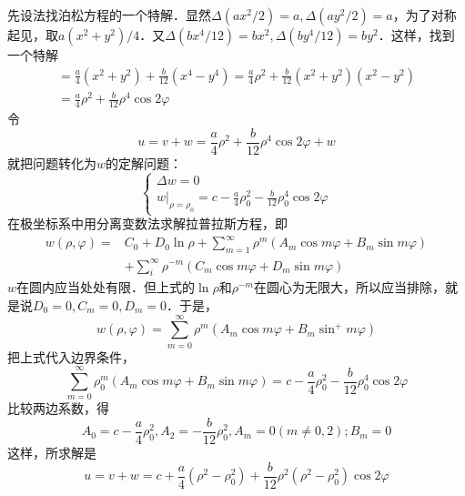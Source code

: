 \begin{example}{}
先设法找泊松方程的一个特解．显然$\Delta (ax^2/2)=a, \Delta (ay^2/2)=a$，为了对称起见，取$a(x^2+y^2)/4$．又$\Delta (bx^4/12)=bx^2,\Delta (by^4/12)=by^2$．这样，找到一个特解
\begin{equation}
    \begin{array}{l}=\frac{a}{4}\left(x^{2}+y^{2}\right)+\frac{b}{12}\left(x^{4}-y^{4}\right)=\frac{a}{4} \rho^{2}+\frac{b}{12}\left(x^{2}+y^{2}\right)\left(x^{2}-y^{2}\right) \\ =\frac{a}{4} \rho^{2}+\frac{b}{12} \rho^{4} \cos 2 \varphi\end{array}
\end{equation}
令
\begin{equation}
    u=v+w=\frac{a}{4} \rho^{2}+\frac{b}{12} \rho^{4} \cos 2 \varphi+w
\end{equation}
就把问题转化为$w$的定解问题：
\begin{equation}
    \left\{\begin{array}{l}\Delta w=0 \\ \left.w\right|_{\rho=\rho_{0}}=c-\frac{a}{4} \rho_{0}^{2}-\frac{b}{12} \rho_{0}^{4} \cos 2 \varphi\end{array}\right.
\end{equation}
在极坐标系中用分离变数法求解拉普拉斯方程，即
\begin{equation}
    \begin{aligned} w(\rho, \varphi)=& C_{0}+D_{0} \ln \rho+\sum_{m=1}^{\infty} \rho^{m}\left(A_{m} \cos m \varphi+B_{m} \sin m \varphi\right) \\ &+\sum_{i}^{\infty} \rho^{-m}\left(C_{m} \cos m \varphi+D_{m} \sin m \varphi\right) \end{aligned}
\end{equation}
$w $在圆内应当处处有限．但上式的$\ln \rho $和$\rho^{-m}$在圆心为无限大，所以应当排除，就是说$D_0=0,C_m=0,D_m=0$．于是，
\begin{equation}
    w(\rho, \varphi)=\sum_{m=0}^{\infty} \rho^{m}\left(A_{m} \cos m \varphi+B_{m} \sin ^{+} m \varphi\right)
\end{equation}
把上式代入边界条件，
\begin{equation}
    \sum_{m=0}^{\infty} \rho_{0}^{m}\left(A_{m} \cos m \varphi+B_{m} \sin m \varphi\right)=c-\frac{a}{4} \rho_{0}^{2}-\frac{b}{12} \rho_{0}^{4} \cos 2 \varphi
\end{equation}
比较两边系数，得
\begin{equation}
    A_{0}=c-\frac{a}{4} \rho_{0}^{2}, A_{2}=-\frac{b}{12} \rho_{0}^{2}, A_{m}=0(m \neq 0,2) ; B_{m}=0
\end{equation}
这样，所求解是
\begin{equation}
    u=v+w=c+\frac{a}{4}\left(\rho^{2}-\rho_{0}^{2}\right)+\frac{b}{12} \rho^{2}\left(\rho^{2}-\rho_{0}^{2}\right) \cos 2 \varphi
\end{equation}
\end{example}

